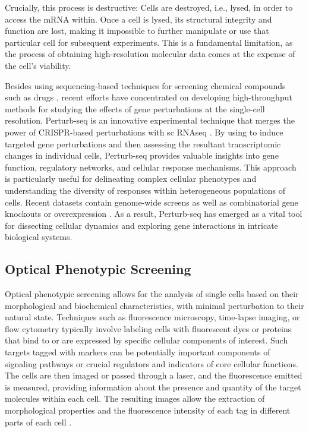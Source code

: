 Crucially, this process is destructive: Cells are destroyed, i.e., lysed, in order to access the \acrshort{mRNA} within.
Once a cell is lysed, its structural integrity and function are lost, making it impossible to further manipulate or use that particular cell for subsequent experiments.
This is a fundamental limitation, as the process of obtaining high-resolution molecular data comes at the expense of the cell's viability.

Besides using sequencing-based techniques for screening chemical compounds such as drugs \citep{srivatsan2020massively}, recent efforts have concentrated on developing high-throughput methods for studying the effects of gene perturbations at the single-cell resolution.
Perturb-seq \citep{dixit2016perturb} is an innovative experimental technique that merges the power of \acrfull{CRISPR}-based perturbations with \acrlong{sc} \acrlong{RNAseq} \citep{mali2013rna}. By using  to induce targeted gene perturbations and then assessing the resultant transcriptomic changes in individual cells, Perturb-seq provides valuable insights into gene function, regulatory networks, and cellular response mechanisms. This approach is particularly useful for delineating complex cellular phenotypes and understanding the diversity of responses within heterogeneous populations of cells.
Recent datasets contain genome-wide screens \citep{replogle2022mapping} as well as combinatorial gene knockouts or overexpression \citep{norman2019exploring}. As a result, Perturb-seq has emerged as a vital tool for dissecting cellular dynamics and exploring gene interactions in intricate biological systems.

\subsection{Optical Phenotypic Screening}
\label{sec:background_imaging}

Optical phenotypic screening allows for the analysis of single cells based on their morphological and biochemical characteristics, with minimal perturbation to their natural state. 
Techniques such as fluorescence microscopy, time-lapse imaging, or flow cytometry typically involve labeling cells with fluorescent dyes or proteins that bind to or are expressed by specific cellular components of interest.
Such targets tagged with markers can be potentially important components of signaling pathways or crucial regulators and indicators of core cellular functions. 
The cells are then imaged or passed through a laser, and the fluorescence emitted is measured, providing information about the presence and quantity of the target molecules within each cell. 
The resulting images allow the extraction of morphological properties and the fluorescence intensity of each tag in different parts of each cell \citep{carpenter2006cellprofiler}.


